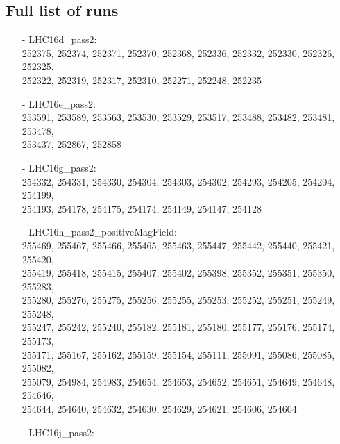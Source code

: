 \begin{appendix}


\section{Full list of runs}\label{sec:appA}

\vspace{\columnsep}
\begin{itemize}
    \small
    \item[] 
    \footnotesize
    \item[-] LHC16d\_pass2:\\[1pt]
     252375, 252374, 252371, 252370, 252368, 252336, 252332, 252330, 252326, 252325,\\
     252322, 252319, 252317, 252310, 252271, 252248, 252235
    \item[-] LHC16e\_pass2:\\[1pt]
     253591, 253589, 253563, 253530, 253529, 253517, 253488, 253482, 253481, 253478,\\
     253437, 252867, 252858
    \item[-] LHC16g\_pass2:\\[1pt]
     254332, 254331, 254330, 254304, 254303, 254302, 254293, 254205, 254204, 254199,\\
     254193, 254178, 254175, 254174, 254149, 254147, 254128
    \item[-] LHC16h\_pass2\_positiveMagField:\\[1pt]
     255469, 255467, 255466, 255465, 255463, 255447, 255442, 255440, 255421, 255420,\\
     255419, 255418, 255415, 255407, 255402, 255398, 255352, 255351, 255350, 255283,\\
     255280, 255276, 255275, 255256, 255255, 255253, 255252, 255251, 255249, 255248,\\
     255247, 255242, 255240, 255182, 255181, 255180, 255177, 255176, 255174, 255173,\\
     255171, 255167, 255162, 255159, 255154, 255111, 255091, 255086, 255085, 255082,\\
     255079, 254984, 254983, 254654, 254653, 254652, 254651, 254649, 254648, 254646,\\
     254644, 254640, 254632, 254630, 254629, 254621, 254606, 254604
    \item[-] LHC16j\_pass2:\\[1pt]

\end{itemize}
\end{appendix}
